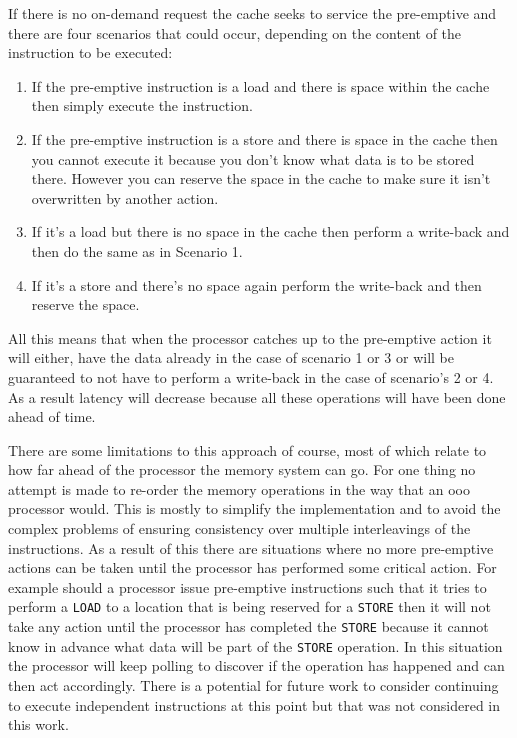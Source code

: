 If there is no on-demand request the cache seeks to service the pre-emptive and there are four scenarios that could occur, depending on the content of the instruction to be executed:

\begin{enumerate}[label=\textbf{Scenario \arabic*:}, align=left, leftmargin=*,labelindent=16pt]
	\item If the pre-emptive instruction is a load and there is space within the cache then simply execute the instruction.
	\item If the pre-emptive instruction is a store and there is space in the cache then you cannot execute it because you don't know what data is to be stored there. However you can reserve the space in the cache to make sure it isn't overwritten by another action.
	\item If it's a load but there is no space in the cache then perform a write-back and then do the same as in Scenario 1.
	\item If it's a store and there's no space again perform the write-back and then reserve the space.
\end{enumerate}


All this means that when the processor catches up to the pre-emptive action it will either, have the data already in the case of scenario 1 or 3 or will be guaranteed to not have to perform a write-back in the case of scenario's 2 or 4. As a result latency will decrease because all these operations will have been done ahead of time. 

There are some limitations to this approach of course, most of which relate to how far ahead of the processor the memory system can go. For one thing no attempt is made to re-order the memory operations in the way that an \gls{ooo} processor would. This is mostly to simplify the implementation and to avoid the complex problems of ensuring consistency over multiple interleavings of the instructions. As a result of this there are situations where no more pre-emptive actions can be taken until the processor has performed some critical action. For example should a processor issue pre-emptive instructions such that it tries to perform a \texttt{LOAD} to a location that is being reserved for a \texttt{STORE} then it will not take any action until the processor has completed the \texttt{STORE} because it cannot know in advance what data will be part of the \texttt{STORE} operation. In this situation the processor will keep polling to discover if the operation has happened and can then act accordingly. There is a potential for future work to consider continuing to execute independent instructions at this point but that was not considered in this work. 


